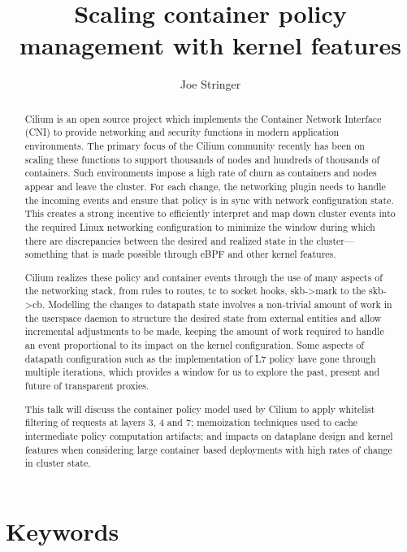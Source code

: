 \documentclass[10pt,sigconf,authorversion]{lpc}
\title{Scaling container policy management with kernel features}
\author{Joe Stringer}
\affiliation{%
      \institution{Cilium.io}}
\begin{document}
\begin{abstract}

Cilium is an open source project which implements the Container Network
Interface (CNI) to provide networking and security functions in modern
application environments. The primary focus of the Cilium community recently
has been on scaling these functions to support thousands of nodes and hundreds
of thousands of containers. Such environments impose a high rate of churn as
containers and nodes appear and leave the cluster. For each change, the
networking plugin needs to handle the incoming events and ensure that policy is
in sync with network configuration state. This creates a strong incentive to
efficiently interpret and map down cluster events into the required Linux
networking configuration to minimize the window during which there are
discrepancies between the desired and realized state in the cluster---something
that is made possible through eBPF and other kernel features.

Cilium realizes these policy and container events through the use of many
aspects of the networking stack, from rules to routes, tc to socket hooks,
skb->mark to the skb->cb. Modelling the changes to datapath state involves a
non-trivial amount of work in the userspace daemon to structure the desired
state from external entities and allow incremental adjustments to be made,
keeping the amount of work required to handle an event proportional to its
impact on the kernel configuration. Some aspects of datapath configuration such
as the implementation of L7 policy have gone through multiple iterations, which
provides a window for us to explore the past, present and future of transparent
proxies.

This talk will discuss the container policy model used by Cilium to apply
whitelist filtering of requests at layers 3, 4 and 7; memoization techniques
used to cache intermediate policy computation artifacts; and impacts on
dataplane design and kernel features when considering large container based
deployments with high rates of change in cluster state.

\end{abstract}

\maketitle

\section{Keywords}
\end{document}
